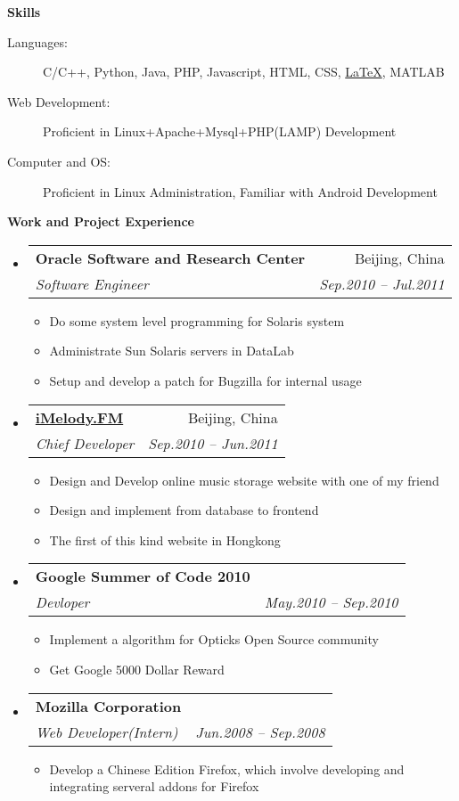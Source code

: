\documentclass[letterpaper,11pt]{article}
\makeatletter
\newcommand{\resitem}[1]{\item #1 \vspace{-2pt}}
\newcommand{\resheading}[1]{{\large \colorbox{mygrey}{\begin{minipage}{\textwidth}{\textbf{#1 \vphantom{p\^{E}}}}\end{minipage}}}}
\newcommand{\ressubheading}[4]{
\begin{tabular*}{6.5in}{l@{\extracolsep{\fill}}r}
		\textbf{#1} & #2 \\
		\textit{#3} & \textit{#4} \\
\end{tabular*}\vspace{-6pt}}
\makeatother
\begin{document}
\resheading{{Skills}}
	\begin{description}
        \item[Languages:] { \footnotesize C/C++, Python, Java, PHP, Javascript, HTML, CSS, \href{http://www.latex-project.org/}{\LaTeX}, MATLAB}
        \item[Web Development:] {Proficient in Linux+Apache+Mysql+PHP(LAMP) Development}
		\item[Computer and OS:] { \footnotesize Proficient in Linux Administration, Familiar with Android Development}
		
	\end{description} %

\resheading{Work and Project Experience}
	\begin{itemize}
		\item 
			\ressubheading{{Oracle Software and Research Center}}{Beijing, China}{Software Engineer}{Sep.2010 -- Jul.2011}
            { \footnotesize
				\begin{itemize}
					\resitem{Do some system level programming for Solaris system}
					\resitem{Administrate Sun Solaris servers in DataLab}
					\resitem{Setup and develop a patch for Bugzilla for internal usage}
				\end{itemize}
			}
		\item
			\ressubheading{\href{http://www.imelody.fm}{iMelody.FM}}{Beijing, China}{Chief Developer}{Sep.2010 -- Jun.2011}
				{ \footnotesize
				\begin{itemize}
					\resitem{Design and Develop online music storage website with one of my friend }
					\resitem{Design and implement from database to frontend}
                    \resitem{The first of this kind website in Hongkong}
				\end{itemize}
          		}
		\item 
			\ressubheading{Google Summer of Code 2010}{}{Devloper}{May.2010 -- Sep.2010}
				{ \footnotesize
				\begin{itemize}
					\resitem{Implement a algorithm for Opticks Open Source community}
                    \resitem{Get Google 5000 Dollar Reward}
				\end{itemize}
				}

		\item			
			\ressubheading{Mozilla Corporation}{}{Web Developer(Intern)}{Jun.2008 -- Sep.2008}
				{ \footnotesize				
				\begin{itemize}
					\item Develop a Chinese Edition Firefox, which involve developing and integrating serveral addons for Firefox
				\end{itemize}
				}

	\end{itemize}  %
\end{document}

